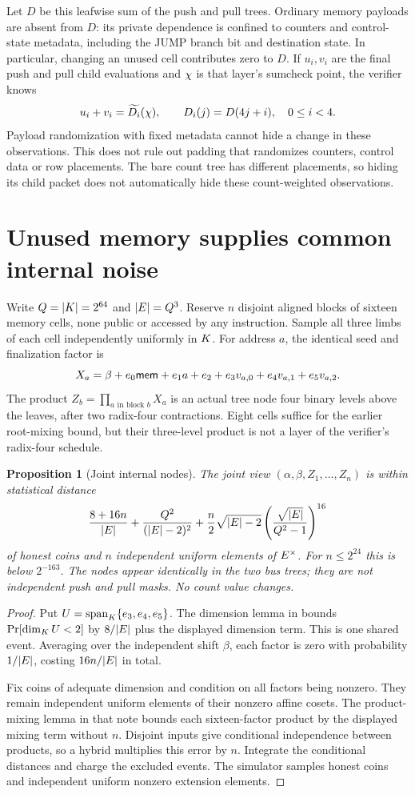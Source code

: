\documentclass[11pt]{article}
\newtheorem{proposition}{Proposition}
\begin{document}
Let $D$ be this leafwise sum of the push and pull trees. Ordinary memory payloads are absent from $D$: its private dependence is confined to counters and control-state metadata, including the JUMP branch bit and destination state. In particular, changing an unused cell contributes zero to $D$. If $u_i,v_i$ are the final push and pull child evaluations and $\chi$ is that layer's sumcheck point, the verifier knows
\[
 u_i+v_i=\widetilde{D_i}(\chi),\qquad D_i(j)=D(4j+i),\quad 0\le i<4.
\]
Payload randomization with fixed metadata cannot hide a change in these observations. This does not rule out padding that randomizes counters, control data or row placements. The bare count tree has different placements, so hiding its child packet does not automatically hide these count-weighted observations.

\section{Unused memory supplies common internal noise}

Write $Q=|K|=2^{64}$ and $|E|=Q^3$. Reserve $n$ disjoint aligned blocks of sixteen memory cells, none public or accessed by any instruction. Sample all three limbs of each cell independently uniformly in $K$. For address $a$, the identical seed and finalization factor is
\[
 X_a=\beta+e_0\mathsf{mem}+e_1a+e_2+e_3v_{a,0}+e_4v_{a,1}+e_5v_{a,2}.
\]
The product $Z_b=\prod_{a\text{ in block }b}X_a$ is an actual tree node four binary levels above the leaves, after two radix-four contractions. Eight cells suffice for the earlier root-mixing bound, but their three-level product is not a layer of the verifier's radix-four schedule.

\begin{proposition}[Joint internal nodes]
The joint view $(\alpha,\beta,Z_1,\ldots,Z_n)$ is within statistical distance
\[
 \frac{8+16n}{|E|}+\frac{Q^2}{(|E|-2)^2}
 +\frac n2\sqrt{|E|-2}
       \left(\frac{\sqrt{|E|}}{Q^2-1}\right)^{16}
\]
of honest coins and $n$ independent uniform elements of $E^\times$. For $n\le2^{24}$ this is below $2^{-163}$. The nodes appear identically in the two bus trees; they are not independent push and pull masks. No count value changes.
\end{proposition}
\begin{proof}
Put $U=\operatorname{span}_{K}\{e_3,e_4,e_5\}$. The dimension lemma in  bounds $\Pr[\dim_{K}U<2]$ by $8/|E|$ plus the displayed dimension term. This is one shared event. Averaging over the independent shift $\beta$, each factor is zero with probability $1/|E|$, costing $16n/|E|$ in total.

Fix coins of adequate dimension and condition on all factors being nonzero. They remain independent uniform elements of their nonzero affine cosets. The product-mixing lemma in that note bounds each sixteen-factor product by the displayed mixing term without $n$. Disjoint inputs give conditional independence between products, so a hybrid multiplies this error by $n$. Integrate the conditional distances and charge the excluded events. The simulator samples honest coins and independent uniform nonzero extension elements.
\end{proof}
\end{document}
